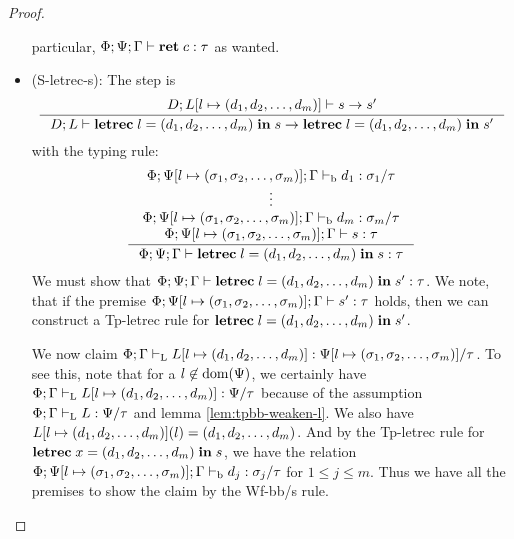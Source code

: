 \documentclass[a4paper, oneside, 10pt, draft]{memoir}
\begin{document}
\begin{proof}
\begin{itemize}
    particular, $\Phi;\Psi;\Gamma |- \mathbf{ret} \; c : \tau$ as wanted.
  \item (S-letrec-s):
    The step is
      \begin{equation*}
        \inference{D;L[l \mapsto \dbundle] |- s -> s'}
        {D;L |- \iletrec{l}{\dbundle}{s} -> \iletrec{l}{\dbundle}{s'}}
      \end{equation*}
    with the typing rule:
        \begin{equation}
          \label{eq:preserv-tp-letrec-s}
          \inference{\Phi;\Psi[l \mapsto \bbtypes];\Gamma \tpb d_1 :
            \sigma_1 / \tau\\
            \vdots\\
            \Phi;\Psi[l \mapsto \bbtypes];\Gamma \tpb d_m : \sigma_m
            / \tau\\
            \Phi;\Psi[l \mapsto \bbtypes];\Gamma |- s : \tau}
          {\Phi;\Psi;\Gamma |- \iletrec{l}{\dbundle}{s} : \tau}\\\\
    \end{equation}
    We must show that $\Phi;\Psi;\Gamma |- \mathbf{letrec} \; l = (d_1, d_2, \dotsc, d_m) \; \mathbf{in} \; s' :
    \tau$. We note, that if the premise $\Phi;\Psi[l \mapsto
    (\sigma_1, \sigma_2, \dotsc, \sigma_m)];\Gamma |- s' : \tau$ holds, then we can construct a
    Tp-letrec rule for $\mathbf{letrec} \; l = (d_1, d_2, \dotsc, d_m) \; \mathbf{in} \; s'$.

    We now claim $\Phi;\Gamma |-_{\mathrm{L}} L[l\mapsto (d_1, d_2, \dotsc, d_m)] : \Psi[l \mapsto (\sigma_1, \sigma_2, \dotsc, \sigma_m)] / \tau$. To see this, note that for a $l \not
    \in \mathrm{dom}(\Psi)$, we certainly have
    $\Phi;\Gamma |-_{\mathrm{L}} L[l\mapsto (d_1, d_2, \dotsc, d_m)] : \Psi / \tau$ because of
    the assumption $\Phi;\Gamma |-_{\mathrm{L}} L : \Psi / \tau$ and lemma
    \ref{lem:tpbb-weaken-l}. We also have $L[l\mapsto (d_1, d_2, \dotsc, d_m)](l) =
    (d_1, d_2, \dotsc, d_m)$. And by the Tp-letrec rule for
    $\mathbf{letrec} \; x = (d_1, d_2, \dotsc, d_m) \; \mathbf{in} \; s$, we have the relation $\Phi;\Psi[l
    \mapsto (\sigma_1, \sigma_2, \dotsc, \sigma_m)];\Gamma |-_{\mathrm{b}} d_j : \sigma_j / \tau$ for $1 \leq j
    \leq m$. Thus we have all the premises to show the claim by the
    Wf-bb/s rule.


\end{itemize}
\end{proof}
\end{document}
